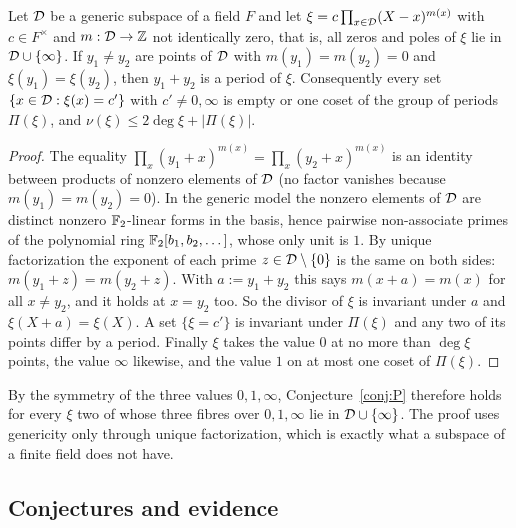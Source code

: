\begin{proposition}\label{prop:split}
Let $\mathcal{D}$ be a generic subspace of a field $F$ and let $\xi=c\prod_{x\in\mathcal{D}}(X-x)^{m(x)}$ with $c\in F^\times$ and $m:\mathcal{D}\to\mathbb Z$ not identically zero, that is, all zeros and poles of $\xi$ lie in $\mathcal{D}\cup\{\infty\}$. If $y_1\ne y_2$ are points of $\mathcal{D}$ with $m(y_1)=m(y_2)=0$ and $\xi(y_1)=\xi(y_2)$, then $y_1+y_2$ is a period of $\xi$. Consequently every set $\{x\in\mathcal{D}:\xi(x)=c'\}$ with $c'\ne0,\infty$ is empty or one coset of the group of periods $\Pi(\xi)$, and $\nu(\xi)\le2\deg\xi+|\Pi(\xi)|$.
\end{proposition}
\begin{proof}
The equality $\prod_x(y_1+x)^{m(x)}=\prod_x(y_2+x)^{m(x)}$ is an identity between products of nonzero elements of $\mathcal{D}$ (no factor vanishes because $m(y_1)=m(y_2)=0$). In the generic model the nonzero elements of $\mathcal{D}$ are distinct nonzero $\mathbb{F}_2$-linear forms in the basis, hence pairwise non-associate primes of the polynomial ring $\mathbb{F}_2[b_1,b_2,\dots]$, whose only unit is $1$. By unique factorization the exponent of each prime $z\in\mathcal{D}\setminus\{0\}$ is the same on both sides: $m(y_1+z)=m(y_2+z)$. With $a:=y_1+y_2$ this says $m(x+a)=m(x)$ for all $x\ne y_2$, and it holds at $x=y_2$ too. So the divisor of $\xi$ is invariant under $a$ and $\xi(X+a)=\xi(X)$. A set $\{\xi=c'\}$ is invariant under $\Pi(\xi)$ and any two of its points differ by a period. Finally $\xi$ takes the value $0$ at no more than $\deg\xi$ points, the value $\infty$ likewise, and the value $1$ on at most one coset of $\Pi(\xi)$.
\end{proof}

By the symmetry of the three values $0,1,\infty$, Conjecture~\ref{conj:P} therefore holds for every $\xi$ two of whose three fibres over $0,1,\infty$ lie in $\mathcal{D}\cup\{\infty\}$. The proof uses genericity only through unique factorization, which is exactly what a subspace of a finite field does not have.

\subsection{Conjectures and evidence}\label{sec:conj}

